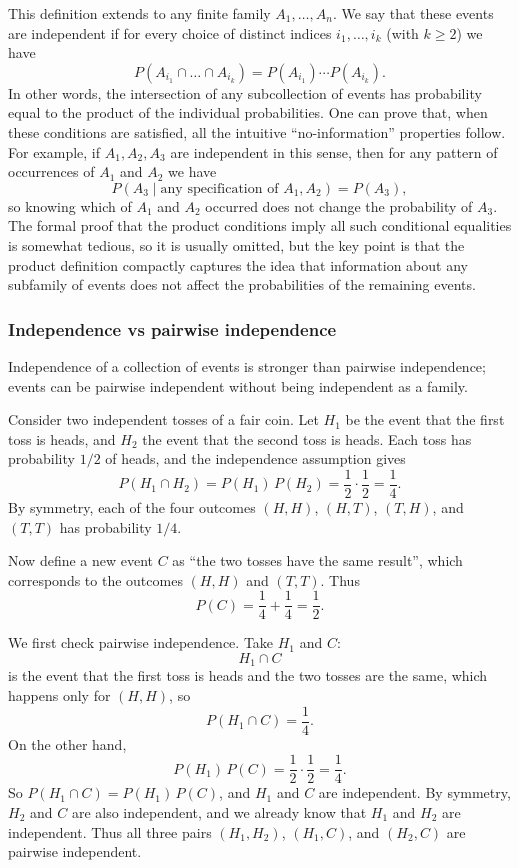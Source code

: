 This definition extends to any finite family \(A_1, \dots, A_n\). We say that these events are independent if for every choice of distinct indices \(i_1, \dots, i_k\) (with \(k \ge 2\)) we have
\[
P(A_{i_1} \cap \dots \cap A_{i_k}) = P(A_{i_1}) \cdots P(A_{i_k}).
\]
In other words, the intersection of any subcollection of events has probability equal to the product of the individual probabilities. One can prove that, when these conditions are satisfied, all the intuitive “no-information” properties follow. For example, if \(A_1, A_2, A_3\) are independent in this sense, then for any pattern of occurrences of \(A_1\) and \(A_2\) we have
\[
P(A_3 \mid \text{any specification of }A_1, A_2) = P(A_3),
\]
so knowing which of \(A_1\) and \(A_2\) occurred does not change the probability of \(A_3\). The formal proof that the product conditions imply all such conditional equalities is somewhat tedious, so it is usually omitted, but the key point is that the product definition compactly captures the idea that information about any subfamily of events does not affect the probabilities of the remaining events.


\subsubsection{Independence vs pairwise independence}

Independence of a collection of events is stronger than pairwise independence; events can be pairwise independent without being independent as a family.

Consider two independent tosses of a fair coin. Let \(H_1\) be the event that the first toss is heads, and \(H_2\) the event that the second toss is heads. Each toss has probability \(1/2\) of heads, and the independence assumption gives
\[
P(H_1 \cap H_2) = P(H_1)\,P(H_2) = \frac{1}{2}\cdot\frac{1}{2} = \frac{1}{4}.
\]
By symmetry, each of the four outcomes \((H,H)\), \((H,T)\), \((T,H)\), and \((T,T)\) has probability \(1/4\).

Now define a new event \(C\) as “the two tosses have the same result”, which corresponds to the outcomes \((H,H)\) and \((T,T)\). Thus
\[
P(C) = \frac{1}{4} + \frac{1}{4} = \frac{1}{2}.
\]

We first check pairwise independence. Take \(H_1\) and \(C\):
\[
H_1 \cap C
\]
is the event that the first toss is heads and the two tosses are the same, which happens only for \((H,H)\), so
\[
P(H_1 \cap C) = \frac{1}{4}.
\]
On the other hand,
\[
P(H_1)\,P(C) = \frac{1}{2}\cdot\frac{1}{2} = \frac{1}{4}.
\]
So \(P(H_1 \cap C) = P(H_1)\,P(C)\), and \(H_1\) and \(C\) are independent. By symmetry, \(H_2\) and \(C\) are also independent, and we already know that \(H_1\) and \(H_2\) are independent. Thus all three pairs \((H_1,H_2)\), \((H_1,C)\), and \((H_2,C)\) are pairwise independent.

